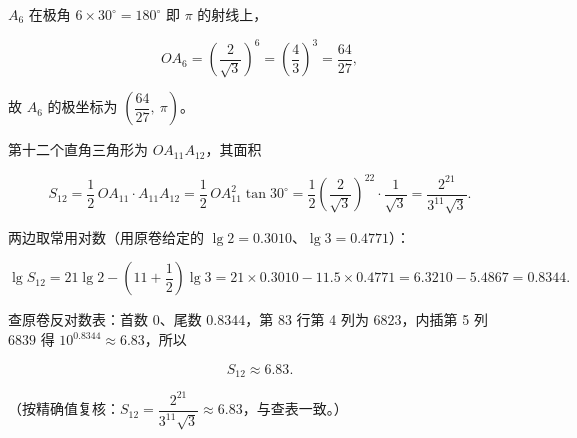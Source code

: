 \begin{answer}
$A_6$ 在极角 $6\times30^\circ=180^\circ$ 即 $\pi$ 的射线上，

\nopagebreak[4]
\[
OA_6=\left(\frac{2}{\sqrt{3}}\right)^{6}=\left(\frac{4}{3}\right)^{3}=\frac{64}{27},
\]

故 $A_6$ 的极坐标为 $\left(\dfrac{64}{27},\ \pi\right)$。


第十二个直角三角形为 $OA_{11}A_{12}$，其面积

\nopagebreak[4]
\[
S_{12}=\frac{1}{2}\,OA_{11}\cdot A_{11}A_{12}
=\frac{1}{2}\,OA_{11}^{2}\tan30^\circ
=\frac{1}{2}\left(\frac{2}{\sqrt{3}}\right)^{22}\cdot\frac{1}{\sqrt{3}}
=\frac{2^{21}}{3^{11}\sqrt{3}}.
\]

两边取常用对数（用原卷给定的 $\lg2=0.3010$、$\lg3=0.4771$）：

\nopagebreak[4]
\[
\lg S_{12}=21\lg2-\left(11+\frac{1}{2}\right)\lg3
=21\times0.3010-11.5\times0.4771
=6.3210-5.4867=0.8344.
\]

查原卷反对数表：首数 $0$、尾数 $0.8344$，第 83 行第 4 列为 $6823$，内插第 5 列 $6839$ 得 $10^{0.8344}\approx6.83$，所以

\nopagebreak[4]
\[
S_{12}\approx6.83.
\]

（按精确值复核：$S_{12}=\dfrac{2^{21}}{3^{11}\sqrt{3}}\approx6.83$，与查表一致。）



\end{answer}